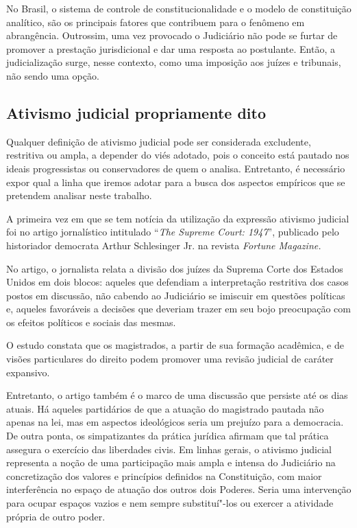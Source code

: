 No Brasil, o sistema de controle de constitucionalidade e o modelo de
constituição analítico, são os principais fatores que contribuem para o
fenômeno em abrangência. Outrossim, uma vez provocado o Judiciário não
pode se furtar de promover a prestação jurisdicional e dar uma resposta
ao postulante. Então, a judicialização surge, nesse contexto, como uma
imposição aos juízes e tribunais, não sendo uma opção.

\subsection{Ativismo judicial propriamente dito}

Qualquer definição de ativismo judicial pode ser considerada excludente,
restritiva ou ampla, a depender do viés adotado, pois o conceito está
pautado nos ideais progressistas ou conservadores de quem o analisa.
Entretanto, é necessário expor qual a linha que iremos adotar para a
busca dos aspectos empíricos que se pretendem analisar neste trabalho.

A primeira vez em que se tem notícia da utilização da expressão ativismo
judicial foi no artigo jornalístico intitulado ``\emph{The Supreme
Court: 1947}'', publicado pelo historiador democrata Arthur Schlesinger
Jr. na revista \emph{Fortune Magazine. }

No artigo, o jornalista relata a divisão dos juízes da Suprema Corte dos
Estados Unidos em dois blocos: aqueles que defendiam a interpretação
restritiva dos casos postos em discussão, não cabendo ao Judiciário se
imiscuir em questões políticas e, aqueles favoráveis a decisões que
deveriam trazer em seu bojo preocupação com os efeitos políticos e
sociais das mesmas.

O estudo constata que os magistrados, a partir de sua formação
acadêmica, e de visões particulares do direito podem promover uma
revisão judicial de caráter expansivo.

Entretanto, o artigo também é o marco de uma discussão que persiste até
os dias atuais. Há aqueles partidários de que a atuação do magistrado
pautada não apenas na lei, mas em aspectos ideológicos seria um prejuízo
para a democracia. De outra ponta, os simpatizantes da prática jurídica
afirmam que tal prática assegura o exercício das liberdades civis. Em
linhas gerais, o ativismo judicial representa a noção de uma
participação mais ampla e intensa do Judiciário na concretização dos
valores e princípios definidos na Constituição, com maior interferência
no espaço de atuação dos outros dois Poderes. Seria uma intervenção para
ocupar espaços vazios e nem sempre substituí"-los ou exercer a atividade
própria de outro poder.

